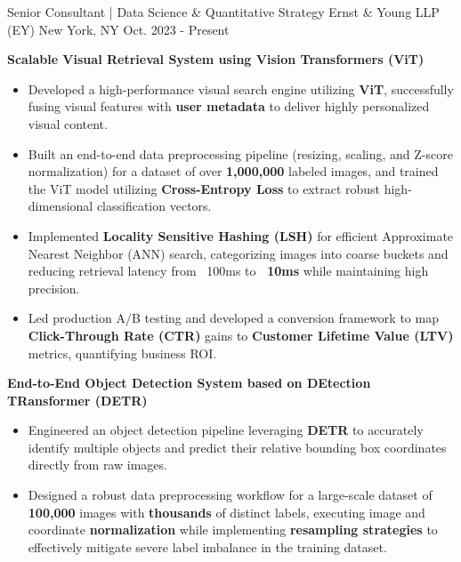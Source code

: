 \vspace{-2.0mm}
\begin{cventries}

\cventry
  {Senior Consultant | Data Science \& Quantitative Strategy}
  {Ernst \& Young LLP (EY)}
  {New York, NY}
  {Oct. 2023 - Present}
  {
    \begin{cvitems}
      \item {\textbf{Scalable Visual Retrieval System using Vision Transformers (ViT)}}
        \begin{itemize}
          \item {Developed a high-performance visual search engine utilizing \textbf{ViT}, successfully fusing visual features with \textbf{user metadata} to deliver highly personalized visual content.}
          \item {Built an end-to-end data preprocessing pipeline (resizing, scaling, and Z-score normalization) for a dataset of over \textbf{1,000,000} labeled images, and trained the ViT model utilizing \textbf{Cross-Entropy Loss} to extract robust high-dimensional classification vectors.}
          \item {Implemented \textbf{Locality Sensitive Hashing (LSH)} for efficient Approximate Nearest Neighbor (ANN) search, categorizing images into coarse buckets and reducing retrieval latency from ~100ms to \textbf{~10ms} while maintaining high precision.}
          \item {Led production A/B testing and developed a conversion framework to map \textbf{Click-Through Rate (CTR)} gains to \textbf{Customer Lifetime Value (LTV)} metrics, quantifying business ROI.}
        \end{itemize}
      \vspace{0.5mm}
      \item {\textbf{End-to-End Object Detection System based on DEtection TRansformer (DETR)}}
        \begin{itemize}
          \item {Engineered an object detection pipeline leveraging \textbf{DETR} to accurately identify multiple objects and predict their relative bounding box coordinates directly from raw images.}
          \item {Designed a robust data preprocessing workflow for a large-scale dataset of \textbf{100,000} images with \textbf{thousands} of distinct labels, executing image and coordinate \textbf{normalization} while implementing \textbf{resampling strategies} to effectively mitigate severe label imbalance in the training dataset.}

\end{itemize}
\end{cvitems}}
\end{cventries}
